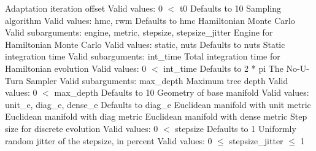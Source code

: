\begin{description}
%
        {Adaptation iteration offset}
        {Valid values: 0 $<$ t0}
        {Defaults to 10}
%
      {Sampling algorithm}
      {Valid values: hmc, rwm}
      {Defaults to hmc}
%
        {Hamiltonian Monte Carlo}
        {Valid subarguments: engine, metric, stepsize, stepsize\_jitter}
%
          {Engine for Hamiltonian Monte Carlo}
          {Valid values: static, nuts}
          {Defaults to nuts}
%
            {Static integration time}
            {Valid subarguments: int\_time}
%
              {Total integration time for Hamiltonian evolution}
              {Valid values: 0 $<$ int\_time}
              {Defaults to 2 * pi}
%
            {The No-U-Turn Sampler}
            {Valid subarguments: max\_depth}
%
              {Maximum tree depth}
              {Valid values: 0 $<$ max\_depth}
              {Defaults to 10}
%
          {Geometry of base manifold}
          {Valid values: unit\_e, diag\_e, dense\_e}
          {Defaults to diag\_e}
%
            {Euclidean manifold with unit metric}
%
            {Euclidean manifold with diag metric}
%
            {Euclidean manifold with dense metric}
%
          {Step size for discrete evolution}
          {Valid values: 0 $<$ stepsize}
          {Defaults to 1}
%
          {Uniformly random jitter of the stepsize, in percent}
          {Valid values: 0 $\le$ stepsize\_jitter $\le$ 1}

\end{description}
